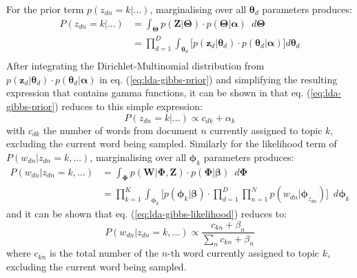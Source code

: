 For the prior term $p({z}_{dn}=k \vert ...)$, marginalising over all $\boldsymbol{\theta}_{d}$ parameters produces:
\begin{equation}
\begin{aligned}
P({z}_{dn}=k \vert ...) &= \int_{\boldsymbol{\Theta}}  p(\boldsymbol{Z} \vert \boldsymbol{\Theta}) \cdot p(\boldsymbol{\Theta} \vert \boldsymbol{\alpha}) \enspace d\boldsymbol{\Theta} \\
                                  &= \prod_{d=1}^{D} \int_{\boldsymbol{\theta}_d} \Bigg[ p(\boldsymbol{z}_{d} \vert \boldsymbol{\theta}_d) \cdot p(\boldsymbol{\theta}_d \vert \boldsymbol{\alpha}) \Bigg] d\boldsymbol{\theta}_d \\
\end{aligned}                                  
\label{eq:lda-gibbs-prior}
\end{equation}
After integrating the Dirichlet-Multinomial distribution from $p(\boldsymbol{z}_{d} \vert \boldsymbol{\theta}_d) \cdot p(\boldsymbol{\theta}_d \vert \boldsymbol{\alpha})$ in eq. (\ref{eq:lda-gibbs-prior}) and simplifying the resulting expression that contains gamma functions, it can be shown in \cite{carpenter2010integrating} that eq. (\ref{eq:lda-gibbs-prior}) reduces to this simple expression:
\begin{equation}
P({z}_{dn}=k \vert ...) \propto  c_{dk} + {\alpha}_k
\label{eq:lda-gibbs-prior-simple}
\end{equation}
with $c_{dk}$ the number of words from document $n$ currently assigned to topic $k$, excluding the current word being sampled. Similarly for the likelihood term of $P({w}_{dn} \vert {z}_{dn}=k, ...)$, marginalising over all $\boldsymbol{\phi}_k$ parameters produces:
\begin{equation}
\begin{aligned}
P({w}_{dn} \vert {z}_{dn}=k, ...) &= \int_{\boldsymbol{\Phi}} p(\boldsymbol{W} \vert \boldsymbol{\Phi}, \boldsymbol{Z}) \cdot p(\boldsymbol{\Phi} \vert \boldsymbol{\beta}) \enspace d\boldsymbol{\Phi} \\
                                                 &= \prod_{k=1}^{K} \int_{\boldsymbol{\phi}_k} \Bigg[ p(\boldsymbol{\phi}_k \vert \boldsymbol{\beta}) \cdot \prod_{d=1}^{D} \prod_{n=1}^{N} p(w_{dn} \vert \boldsymbol{\phi}_{z_{dn}}) \Bigg]\enspace d\boldsymbol{\phi}_k
\end{aligned}
\label{eq:lda-gibbs-likelihood}
\end{equation}
and it can be shown that eq. (\ref{eq:lda-gibbs-likelihood}) reduces to:
\begin{equation}
P({w}_{dn} \vert {z}_{dn}=k, ...) \propto \frac{c_{kn} + {\beta}_n}{\sum_{n} c_{kn} + {\beta}_n}
\label{eq:lda-gibbs-likelihood-simple}
\end{equation}
where $c_{kn}$ is the total number of the $n$-th word currently assigned to topic $k$, excluding the current word being sampled.  

